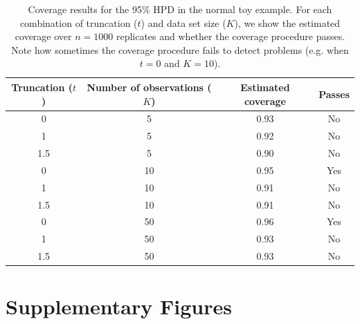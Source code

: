 \documentclass[oneside]{article}
\begin{document}
\begin{table}[]
\caption{Coverage results for the 95\% HPD in the normal toy example.
For each combination of truncation ($t$) and data set size ($K$), we show the estimated coverage over $n=1000$ replicates and whether the coverage procedure passes.
Note how sometimes the coverage procedure fails to detect problems (e.g. when $t=0$ and $K=10$).
}
\begin{center}
\begin{tabular}{@{}cccc@{}}
\toprule
Truncation ($t$) & Number of observations ($K$) & Estimated coverage & Passes \\ \midrule
0                & 5                           & 0.93              & No     \\
1                & 5                           & 0.92              & No     \\
1.5              & 5                           & 0.90              & No     \\
0                & 10                          & 0.95              & Yes    \\
1                & 10                          & 0.91              & No     \\
1.5              & 10                          & 0.91              & No     \\
0                & 50                          & 0.96              & Yes    \\
1                & 50                          & 0.93               & No     \\
1.5              & 50                          & 0.93               & No     \\ \bottomrule
\end{tabular}
\end{center}
\end{table}

\newpage
\section{Supplementary Figures}
\label{appendix::sec:supp_figures}
\end{document}

